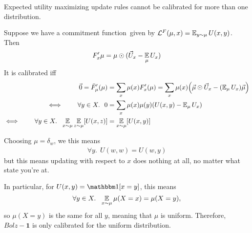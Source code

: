 \documentclass{article}
\def\cofunc{commitment function}
\begin{document}
\begin{prop}
	Expected utility maximizing update rules cannot be calibrated for more than one distribution.

\end{prop}
\begin{lproof}
	Suppose we have a \cofunc\ given by
	$\mathcal L^{F}(\mu, x) = \operatorname*{\mathbb{E}}_{y \sim \mu} U(x,y)$.
	Then
	\[ 
		F'_{x} \mu = \mu \odot (\vec U_x - \operatorname*{\mathbb{E}}_{\mu}{U_x})
	\] 
	It is calibrated iff 
	\begin{align*}
		\vec 0 =  \bar F'_\mu(\mu) 
			&= \sum_{x} \mu(x)  F'_{x} (\mu)
			= \sum_{x} \mu(x) \Big( \vec \mu \odot \vec U_x - (\operatorname*{\mathbb{E}}\nolimits_{\mu}{U_x}) \vec \mu \Big) \\
		\iff\qquad
		\forall y \in X.~~
			0 &= \sum_{x} \mu(x) \mu(y) ( U(x,y) - \operatorname*{\mathbb{E}}\nolimits_{\mu} U_x ) \\
		\iff\qquad
		\forall y \in X.~~
			\operatorname*{\mathbb{E}}_{x \sim \mu}\operatorname*{\mathbb{E}}_{z\sim \mu}[ U(x,z) ] &= \operatorname*{\mathbb{E}}_{x \sim \mu}[ U(x,y) ]
	\end{align*} 
    
    \begin{phaseout}
	Choosing $\mu = \delta_w$, we this means
	\begin{align*}
		\forall y.~~ U(w,w) = U(w,y)
	\end{align*}
	but this means updating with respect to $x$ does nothing at all, no matter what state you're at.
    \end{phaseout}
    
    In particular, for $U(x,y) = \mathbbm 1[x=y]$, this means 
    \[
        \forall y \in X.~~
        \operatorname*{\mathbb{E}}_{x \sim \mu}\mu(X=x) = \mu(X=y),
    \]
    so $\mu(X=y)$ is the same for all $y$, meaning that $\mu$ is uniform.
    Therefore, $\mathit{Bolz-}\mathbf{1}$ is only calibrated for the uniform distribution.
\end{lproof}
\end{document}
